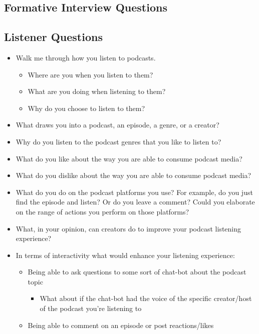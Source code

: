\documentclass[12pt]{report}
\begin{document}
\begin{myfont}
        \chapter{Formative Interview Questions}
        \section{Listener Questions}
        \label{app:B}
        \begin{itemize}
          \item Walk me through how you listen to podcasts.
          \begin{itemize}
            \item Where are you when you listen to them?
            \item What are you doing when listening to them?
            \item Why do you choose to listen to them?
          \end{itemize}
          \item What draws you into a podcast, an episode, a genre, or a creator?
          \item Why do you listen to the podcast genres that you like to listen to?
          \item What do you like about the way you are able to consume podcast media?
          \item What do you dislike about the way you are able to consume podcast media?
          \item What do you do on the podcast platforms you use? For example, do you just find the episode and listen? Or do you leave a comment? Could you elaborate on the range of actions you perform on those platforms?
          \item What, in your opinion, can creators do to improve your podcast listening experience?
          \item In terms of interactivity what would enhance your listening experience:
          \begin{itemize}
            \item Being able to ask questions to some sort of chat-bot about the podcast topic
            \begin{itemize}
              \item What about if the chat-bot had the voice of the specific creator/host of the podcast you’re listening to
            \end{itemize}
            \item Being able to comment on an episode or post reactions/likes

\end{itemize}
\end{itemize}
\end{myfont}
\end{document}
